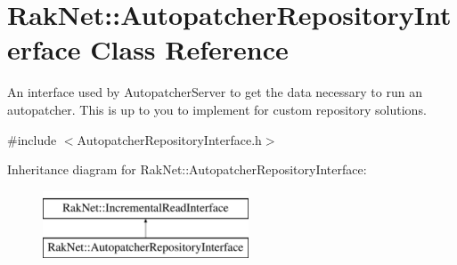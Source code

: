 \hypertarget{class_rak_net_1_1_autopatcher_repository_interface}{\section{Rak\-Net\-:\-:Autopatcher\-Repository\-Interface Class Reference}
\label{class_rak_net_1_1_autopatcher_repository_interface}
}


An interface used by Autopatcher\-Server to get the data necessary to run an autopatcher. This is up to you to implement for custom repository solutions.  




{\ttfamily \#include $<$Autopatcher\-Repository\-Interface.\-h$>$}

Inheritance diagram for Rak\-Net\-:\-:Autopatcher\-Repository\-Interface\-:\begin{figure}[H]
\begin{center}
\leavevmode
\includegraphics[height=2.000000cm]{class_rak_net_1_1_autopatcher_repository_interface}
\end{center}
\end{figure}
